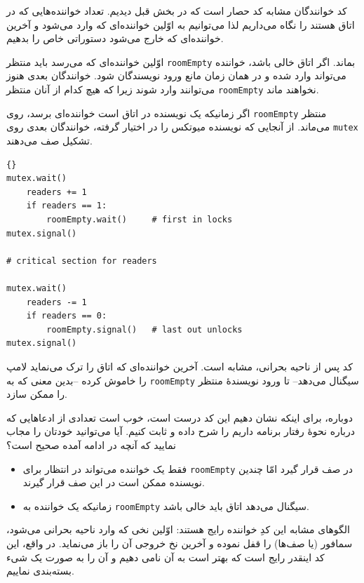 \documentclass{book}
\begin{document}
    کد خوانندگان مشابه کد حصار است که در بخش قبل دیدیم. تعداد خواننده‌هایی که در اتاق هستند را نگاه می‌داریم لذا می‌توانیم به 
    اوّلین خواننده‌ای که وارد می‌شود و آخرین خواننده‌ای که خارج می‌شود دستوراتی خاص را بدهیم. 

    اوّلین خواننده‌ای که می‌رسد باید منتظر  {\tt roomEmpty} بماند. اگر اتاق خالی باشد،‌ خواننده می‌تواند وارد شده و در همان زمان 
    مانع ورود نویسندگان شود. خوانندگان بعدی هنوز می‌توانند وارد شوند زیرا که هیچ کدام از آنان منتظر  {\tt roomEmpty} نخواهند ماند. 

    اگر زمانیکه یک نویسنده در اتاق است خواننده‌ای برسد، روی {\tt roomEmpty} منتظر می‌ماند. از آنجایی که نویسنده 
    میوتکس را در اختیار گرفته، خوانندگان بعدی روی  {\tt mutex} تشکیل صف می‌دهند. 
\begin{latin}
\begin{lstlisting}[title=\rl{راه‌حل خوانندگان}]{}
mutex.wait()
    readers += 1
    if readers == 1:
        roomEmpty.wait()     # first in locks
mutex.signal()

# critical section for readers

mutex.wait()
    readers -= 1
    if readers == 0:
        roomEmpty.signal()   # last out unlocks
mutex.signal()
\end{lstlisting}
\end{latin}

    کد پس از ناحیه بحرانی، مشابه است. آخرین خواننده‌ای که اتاق را ترک می‌نماید لامپ را خاموش کرده --بدین معنی که به {\tt roomEmpty}
    سیگنال می‌دهد-- تا ورود نویسندهٔ منتظر را ممکن سازد. 

    دوباره، برای اینکه نشان دهیم این کد درست است، خوب است 
    تعدادی از ادعاهایی که درباره نحوهٔ رفتار برنامه داریم را شرح داده و ثابت کنیم. 
    آیا می‌توانید خودتان را مجاب نمایید که آنچه در ادامه آمده صحیح است؟

\begin{itemize}

\item 
    فقط یک خواننده می‌تواند در انتظار برای {\tt roomEmpty} در صف قرار گیرد امّا چندین نویسنده ممکن است در این صف قرار گیرند. 

\item 
    زمانیکه یک خواننده به {\tt roomEmpty} سیگنال می‌دهد اتاق باید خالی باشد. 
\end{itemize}


    الگوهای مشابه این کدِ خواننده رایج هستند: اوّلین نخی که وارد ناحیه بحرانی می‌شود، سمافور (یا صف‌ها) را قفل نموده و آخرین نخ خروجی آن را باز می‌نماید. 
    در واقع، این کد اینقدر رایج است که بهتر است به آن نامی دهیم و آن را به صورت یک شیء بسته‌بندی نماییم. 
    
\end{document}
